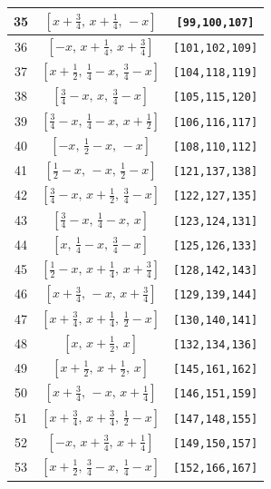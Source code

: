 \documentclass[fleqn,8pt]{jsarticle}
\begin{document}
\begin{longtable}{ccc}
35 & $\left[ x + \frac{3}{4},\, x + \frac{1}{4},\, - x \right]$ & {\tt [99,100,107]} \\ \hline
36 & $\left[ - x,\, x + \frac{1}{4},\, x + \frac{3}{4} \right]$ & {\tt [101,102,109]} \\ \hline
37 & $\left[ x + \frac{1}{2},\, \frac{1}{4} - x,\, \frac{3}{4} - x \right]$ & {\tt [104,118,119]} \\ \hline
38 & $\left[ \frac{3}{4} - x,\, x,\, \frac{3}{4} - x \right]$ & {\tt [105,115,120]} \\ \hline
39 & $\left[ \frac{3}{4} - x,\, \frac{1}{4} - x,\, x + \frac{1}{2} \right]$ & {\tt [106,116,117]} \\ \hline
40 & $\left[ - x,\, \frac{1}{2} - x,\, - x \right]$ & {\tt [108,110,112]} \\ \hline
41 & $\left[ \frac{1}{2} - x,\, - x,\, \frac{1}{2} - x \right]$ & {\tt [121,137,138]} \\ \hline
42 & $\left[ \frac{3}{4} - x,\, x + \frac{1}{2},\, \frac{3}{4} - x \right]$ & {\tt [122,127,135]} \\ \hline
43 & $\left[ \frac{3}{4} - x,\, \frac{1}{4} - x,\, x \right]$ & {\tt [123,124,131]} \\ \hline
44 & $\left[ x,\, \frac{1}{4} - x,\, \frac{3}{4} - x \right]$ & {\tt [125,126,133]} \\ \hline
45 & $\left[ \frac{1}{2} - x,\, x + \frac{1}{4},\, x + \frac{3}{4} \right]$ & {\tt [128,142,143]} \\ \hline
46 & $\left[ x + \frac{3}{4},\, - x,\, x + \frac{3}{4} \right]$ & {\tt [129,139,144]} \\ \hline
47 & $\left[ x + \frac{3}{4},\, x + \frac{1}{4},\, \frac{1}{2} - x \right]$ & {\tt [130,140,141]} \\ \hline
48 & $\left[ x,\, x + \frac{1}{2},\, x \right]$ & {\tt [132,134,136]} \\ \hline
49 & $\left[ x + \frac{1}{2},\, x + \frac{1}{2},\, x \right]$ & {\tt [145,161,162]} \\ \hline
50 & $\left[ x + \frac{3}{4},\, - x,\, x + \frac{1}{4} \right]$ & {\tt [146,151,159]} \\ \hline
51 & $\left[ x + \frac{3}{4},\, x + \frac{3}{4},\, \frac{1}{2} - x \right]$ & {\tt [147,148,155]} \\ \hline
52 & $\left[ - x,\, x + \frac{3}{4},\, x + \frac{1}{4} \right]$ & {\tt [149,150,157]} \\ \hline
53 & $\left[ x + \frac{1}{2},\, \frac{3}{4} - x,\, \frac{1}{4} - x \right]$ & {\tt [152,166,167]} \\ \hline

\end{longtable}
\end{document}
